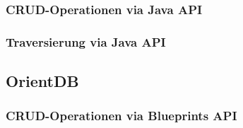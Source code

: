 \subsubsection{CRUD-Operationen via Java API}

\subsubsection{Traversierung via Java API}

\subsection{OrientDB}

\subsubsection{CRUD-Operationen via Blueprints API}
\label{anh:orientdb_blueprints_api}

